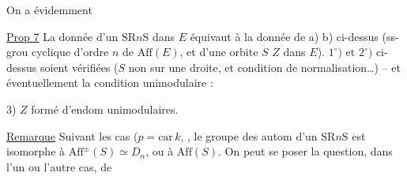 On a évidemment

\uline{Prop 7} La donnée d'un  $\mathrm{SR}n\mathrm S$ dans $E$ équivaut à la donnée de a) b) ci-dessus (ss-grou  cyclique d'ordre $n$ de $\mathrm{Aff}(E)$, et d'une orbite $S$  $Z$ dans $E$).   $1^\circ)$ et $2^\circ)$ ci-dessus soient vérifiées ($S$ non sur une droite, et condition de normalisation\ldots) -- et éventuellement la condition unimodulaire :

3) $Z$ formé d'endom unimodulaires.

\uline{Remarque} Suivant les cas ($p=\mathrm{car}\, k$, , le groupe des autom d'un  $\mathrm{SR}n\mathrm S$ est isomorphe à $\mathrm{Aff}^{\pm}(S)\simeq D_n$, ou à $\mathrm{Aff}(S)$. On peut se poser la question, dans l'un ou l'autre cas, de 
